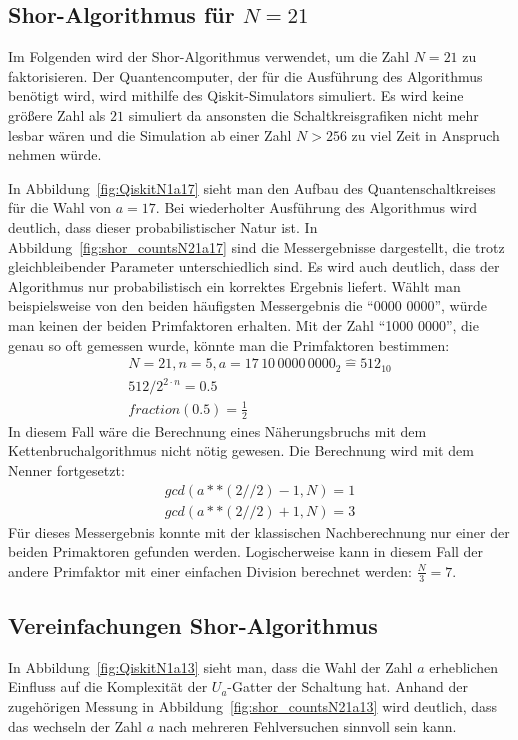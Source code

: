 \documentclass[lettersize,journal]{IEEEtran}
\begin{document}
\subsection{Shor-Algorithmus für \(N = 21\)}
Im Folgenden wird der Shor-Algorithmus verwendet,
um die Zahl \(N = 21\) zu faktorisieren.
Der Quantencomputer, der für die Ausführung des Algorithmus benötigt wird,
wird mithilfe des Qiskit-Simulators simuliert.
Es wird keine größere Zahl als \(21\) simuliert
da ansonsten die Schaltkreisgrafiken nicht mehr lesbar wären und
die Simulation ab einer Zahl \(N > 256\) zu viel Zeit in Anspruch nehmen würde.

In Abbildung~\ref{fig:QiskitN1a17} sieht man den Aufbau des Quantenschaltkreises
für die Wahl von \(a = 17\).
Bei wiederholter Ausführung des Algorithmus wird deutlich,
dass dieser probabilistischer Natur ist.
In Abbildung~\ref{fig:shor_countsN21a17} sind die Messergebnisse dargestellt,
die trotz gleichbleibender Parameter unterschiedlich sind.
Es wird auch deutlich, dass der Algorithmus nur probabilistisch ein korrektes Ergebnis liefert.
Wählt man beispielsweise von den beiden häufigsten Messergebnis die "`0000 0000"',
würde man keinen der beiden Primfaktoren erhalten.
Mit der Zahl "`1000 0000"', die  genau so oft gemessen wurde, könnte man die Primfaktoren bestimmen:
\begin{equation*}
\begin{split}
  N = 21,
  n = 5,
  a = 17\,10\,0000\,0000_2 \widehat{=} 512_{10}\\
  512/2^{2\cdot n} = 0.5\\
  fraction(0.5) = \frac{1}{2}
\end{split}
\end{equation*}
In diesem Fall wäre die Berechnung eines Näherungsbruchs mit dem Kettenbruchalgorithmus nicht nötig gewesen.
Die Berechnung wird mit dem Nenner fortgesetzt:
\begin{equation*}
\begin{split}
  gcd(a**(2//2)-1, N) = 1\\
  gcd(a**(2//2)+1, N) = 3
\end{split}
\end{equation*}
Für dieses Messergebnis konnte mit der klassischen Nachberechnung
nur einer der beiden Primaktoren gefunden werden.
Logischerweise kann in diesem Fall der andere Primfaktor mit einer einfachen Division berechnet werden:
\(\frac{N}{3} = 7\).

\subsection{Vereinfachungen Shor-Algorithmus}
In Abbildung~\ref{fig:QiskitN1a13} sieht man,
dass die Wahl der Zahl \(a\) erheblichen Einfluss auf die Komplexität der \(U_a\)-Gatter der Schaltung hat.
Anhand der zugehörigen Messung in Abbildung~\ref{fig:shor_countsN21a13} wird deutlich,
dass das wechseln der Zahl \(a\) nach mehreren Fehlversuchen sinnvoll sein kann.
\end{document}
